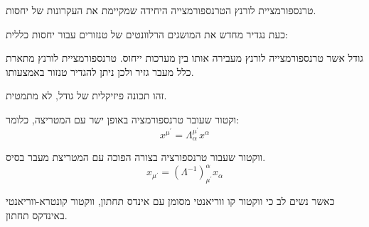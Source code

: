 \documentclass{tstextbook}
\begin{document}
\begin{proposition}
טרנספורמציית לורנץ הטרנספורמצייה היחידה שמקיימת את העקרונות של יחסות.

\end{proposition}
כעת נגדיר מחדש את המושגים הרלוונטים של טנזורים עבור יחסות כללית:

\begin{definition}[טנזור]
גודל אשר טרנספורמצייה לורנץ מעבירה אותו בין מערכות ייחוס. טרנספורמציית לורנץ מתארת כלל מעבר גזיר ולכן ניתן להגדיר טנזור באמצעותו.

\end{definition}
\begin{remark}
זהו תכונה פיזיקלית של גודל, לא מתמטית.

\end{remark}
\begin{definition}
וקטור שעובר טרנספורמציה באופן ישר עם המטריצה, כלומר:
$$x^{\mu^{'}}=\Lambda_{\alpha}^{\mu^{'}}x^{\alpha}$$

\end{definition}
\begin{definition}
ווקטור שעבור טרנספורציה בצורה הפוכה עם המטריצת מעבר בסיס.
$$x_{\mu^{'}}=\left( \Lambda ^{-1} \right)^{\alpha}_{\mu^{'}}x_{\alpha}$$

\end{definition}
כאשר נשים לב כי ווקטור קו ווריאנטי מסומן עם אינדס תחתון, ווקטור קונטרא-ווריאנטי באינדקס תחתון.
\end{document}
